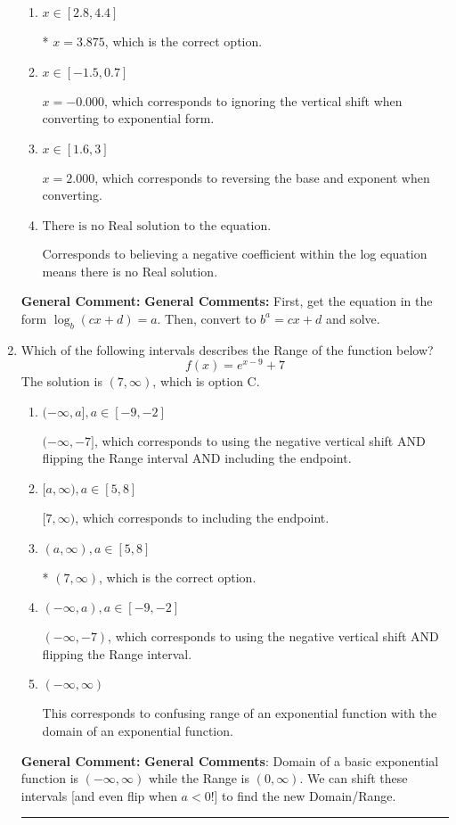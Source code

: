 \documentclass{extbook}[14pt]
\newcommand{\litem}[1]{\item #1

\rule{\textwidth}{0.4pt}}
\begin{document}
\begin{enumerate}
{\begin{enumerate}[label=\Alph*.]
$x = -6.000$, which corresponds to reversing the base and exponent when converting and reversing the value with $x$.
\item \( x \in [2.8, 4.4] \)

* $x = 3.875$, which is the correct option.
\item \( x \in [-1.5, 0.7] \)

$x = -0.000$, which corresponds to ignoring the vertical shift when converting to exponential form.
\item \( x \in [1.6, 3] \)

$x = 2.000$, which corresponds to reversing the base and exponent when converting.
\item \( \text{There is no Real solution to the equation.} \)

Corresponds to believing a negative coefficient within the log equation means there is no Real solution.
\end{enumerate}

\textbf{General Comment:} \textbf{General Comments:} First, get the equation in the form $\log_b{(cx+d)} = a$. Then, convert to $b^a = cx+d$ and solve.
}
\litem{
Which of the following intervals describes the Range of the function below?
\[ f(x) = e^{x-9}+7 \]The solution is \( (7, \infty) \), which is option C.\begin{enumerate}[label=\Alph*.]
\item \( (-\infty, a], a \in [-9, -2] \)

$(-\infty, -7]$, which corresponds to using the negative vertical shift AND flipping the Range interval AND including the endpoint.
\item \( [a, \infty), a \in [5, 8] \)

$[7, \infty)$, which corresponds to including the endpoint.
\item \( (a, \infty), a \in [5, 8] \)

* $(7, \infty)$, which is the correct option.
\item \( (-\infty, a), a \in [-9, -2] \)

$(-\infty, -7)$, which corresponds to using the negative vertical shift AND flipping the Range interval.
\item \( (-\infty, \infty) \)

This corresponds to confusing range of an exponential function with the domain of an exponential function.
\end{enumerate}

\textbf{General Comment:} \textbf{General Comments}: Domain of a basic exponential function is $(-\infty, \infty)$ while the Range is $(0, \infty)$. We can shift these intervals [and even flip when $a<0$!] to find the new Domain/Range.
}
\end{enumerate}
\end{document}
